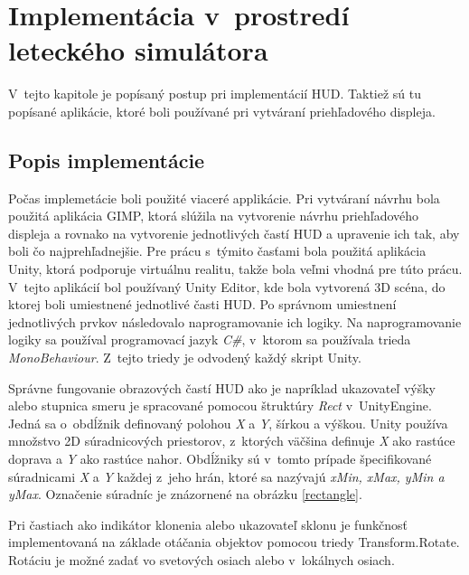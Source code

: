 \chapter{Implementácia v~prostredí leteckého simulátora}
V~tejto kapitole je popísaný postup pri implementácií HUD. Taktiež sú tu popísané aplikácie, ktoré boli používané pri vytváraní priehľadového displeja.

\section{Popis implementácie}
Počas implemetácie boli použité viaceré applikácie. Pri vytváraní návrhu bola použitá aplikácia GIMP, ktorá slúžila na vytvorenie návrhu priehľadového displeja a rovnako na vytvorenie jednotlivých častí HUD a upravenie ich tak, aby boli čo najprehľadnejšie. Pre prácu s~týmito časťami bola použitá aplikácia Unity, ktorá podporuje virtuálnu realitu, takže bola veľmi vhodná pre túto prácu. V~tejto aplikácií bol používaný Unity Editor, kde bola vytvorená 3D scéna, do ktorej boli umiestnené jednotlivé časti HUD. Po správnom umiestnení jednotlivých prvkov následovalo naprogramovanie ich logiky. Na naprogramovanie logiky sa používal programovací jazyk \textit{C\#}, v~ktorom sa používala trieda \textit{MonoBehaviour}. Z~tejto triedy je odvodený každý skript Unity.

Správne fungovanie obrazových častí HUD ako je napríklad ukazovateľ výšky alebo stupnica smeru je spracované pomocou štruktúry \textit{Rect} v~UnityEngine. Jedná sa o~obdĺžnik definovaný polohou \textit{X} a \textit{Y}, šírkou a výškou. Unity používa množstvo 2D súradnicových priestorov, z~ktorých väčšina definuje \textit{X} ako rastúce doprava a \textit{Y} ako rastúce nahor. Obdĺžniky sú v~tomto prípade špecifikované súradnicami \textit{X} a \textit{Y} každej z~jeho hrán, ktoré sa nazývajú \textit{xMin, xMax, yMin a yMax}. Označenie súradníc je znázornené na obrázku \ref{rectangle}.

Pri častiach ako indikátor klonenia alebo ukazovateľ sklonu je funkčnosť implementovaná na základe otáčania objektov pomocou triedy Transform.Rotate. Rotáciu je možné zadať vo svetových osiach alebo v~lokálnych osiach.

